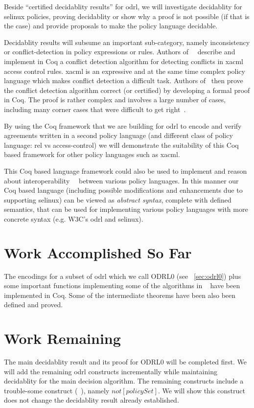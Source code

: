 Beside ``certified decidablity results'' for \ac{odrl}, we will investigate decidablity for \ac{selinux} policies, proving decidablity or show why a proof is not possible (if that is the case) and provide proposals to make the policy language decidable.

Decidablity results will subsume an important sub-category, namely inconsistency or conflict-detection in policy expressions or rules. Authors of~\cite{st2012verified}~\cite{felty13} describe and implement in Coq a conflict detection algorithm for detecting conflicts in \ac{xacml} access control rules. \ac{xacml} is an expressive and at the same time complex policy language which makes conflict detection a difficult task. Authors of~\cite{st2012verified} then prove the conflict detection algorithm correct (or certified) by developing a formal proof in Coq. The proof is rather complex and involves a large number of cases, including many
corner cases that were difficult to get right~\cite{st2012verified}. 

By using the Coq framework that we are building for \ac{odrl} to encode and verify agreements written in a second policy language (and different class of policy language: \ac{rel} vs access-control) we will demonstrate the suitability of this Coq based framework for other policy languages such as \ac{xacml}. 

This Coq based language framework could also be used to implement and reason about interoperability~\cite{prados2005interoperability}~\cite{maronas2009architecture} between various policy languages. In this manner our Coq based language (including possible modifications and enhancements due to supporting \ac{selinux}) can be viewed as \emph{abstract syntax}, complete with defined semantics, that can be used for implementing various policy languages with more concrete syntax (e.g. W3C's \ac{odrl} and \ac{selinux}). 

\section{Work Accomplished So Far}

The encodings for a subset of \ac{odrl} which we call ODRL0 (see ~\ref{sec:odrl0}) plus some important functions implementing some of the algorithms in ~\cite{pucella2006} have been implemented in Coq. Some of the intermediate theorems have been also been defined and proved.

\section{Work Remaining}
The main decidablity result and its proof for ODRL0 will be completed first. We will add the remaining \ac{odrl} constructs incrementally while maintaining decidablity for the main decision algorithm. The remaining constructs include a trouble-some construct (~\cite{pucella2006}), namely $not[policySet]$. We will show this construct does not change the decidablity result already established. 

